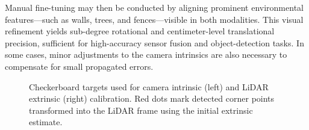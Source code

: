 \documentclass[../main.tex]{subfiles}
\begin{document}
Manual fine-tuning may then be conducted by aligning prominent environmental features—such as walls, trees, and fences—visible in both modalities.  
This visual refinement yields sub-degree rotational and centimeter-level translational precision, sufficient for high-accuracy sensor fusion and object-detection tasks.  
In some cases, minor adjustments to the camera intrinsics are also necessary to compensate for small propagated errors.

\begin{figure}[htbp]
\centering
{}
\caption{Checkerboard targets used for camera intrinsic (left) and LiDAR extrinsic (right) calibration. Red dots mark detected corner points transformed into the LiDAR frame using the initial extrinsic estimate.}
\label{fig:camLidar_calib}
\end{figure}
\end{document}
